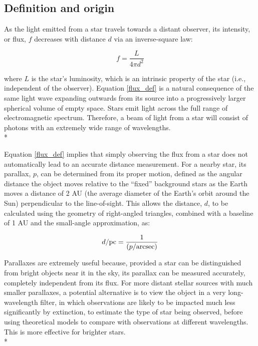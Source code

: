 \documentclass[12pt, a4paper]{report}
\begin{document}
\subsection{Definition and origin}

As the light emitted from a star travels towards a distant observer, its intensity, or flux, $f$ decreases with distance $d$ via an inverse-square law:

\begin{equation}
\label{flux_def}
f = \frac{L}{4 \pi d^{2}}
\end{equation}

where $L$ is the star's luminosity, which is an intrinsic property of the star (i.e., independent of the observer). Equation \ref{flux_def} is a natural consequence of the same light wave expanding outwards from its source into a progressively larger spherical volume of empty space. Stars emit light across the full range of electromagnetic spectrum. Therefore, a beam of light from a star will consist of photons with an extremely wide range of wavelengths. \\*

Equation \ref{flux_def} implies that simply observing the flux from a star does not automatically lead to an accurate distance measurement. For a nearby star, its parallax, $p$, can be determined from its proper motion, defined as the angular distance the object moves relative to the ``fixed'' background stars as the Earth moves a distance of 2 AU  (the average diameter of the Earth's orbit around the Sun) perpendicular to the line-of-sight. This allows the distance, $d$, to be calculated using the geometry of right-angled triangles, combined with a baseline of 1 AU and the small-angle approximation, as:

\begin{equation}
d/\textnormal{pc} = \frac{1}{(p/\textnormal{arcsec})}
\end{equation}

Parallaxes are extremely useful because, provided a star can be distinguished from bright objects near it in the sky, its parallax can be measured accurately, completely independent from its flux. For more distant stellar sources with much smaller parallaxes, a potential alternative is to view the object in a very long-wavelength filter, in which observations are likely to be impacted much less significantly by extinction, to estimate the type of star being observed, before using theoretical models to compare with observations at different wavelengths. This is more effective for brighter stars. \\*
\end{document}
